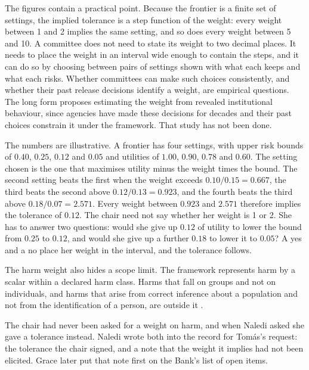 The figures contain a practical point. Because the frontier is a finite set of
settings, the implied tolerance is a step function of the weight: every weight between
1 and 2 implies the same setting, and so does every weight between 5 and 10. A
committee does not need to state its weight to two decimal places. It needs to place
the weight in an interval wide enough to contain the steps, and it can do so by
choosing between pairs of settings shown with what each keeps and what each risks.
Whether committees can make such choices consistently, and whether their past release
decisions identify a weight, are empirical questions. The long form proposes estimating
the weight from revealed institutional behaviour, since agencies have made these
decisions for decades and their past choices constrain it under the framework. That
study has not been done.

\begin{example}\label{c18:ex-weight}
The numbers are illustrative. A frontier has four settings, with upper risk bounds of
$0.40$, $0.25$, $0.12$ and $0.05$ and utilities of $1.00$, $0.90$, $0.78$ and $0.60$. The setting chosen is
the one that maximises utility minus the weight times the bound. The second setting beats
the first when the weight exceeds $0.10/0.15=0.667$, the third beats the second above
$0.12/0.13=0.923$, and the fourth beats the third above $0.18/0.07=2.571$. Every weight between
$0.923$ and $2.571$ therefore implies the tolerance of $0.12$. The chair need not say whether her
weight is 1 or 2. She has to answer two questions: would she give up $0.12$ of utility to
lower the bound from $0.25$ to $0.12$, and would she give up a further $0.18$ to lower it to
$0.05$? A yes and a no place her weight in the interval, and the tolerance follows.
\end{example}

The harm weight also hides a scope limit. The framework represents harm by a scalar
within a declared harm class. Harms that fall on groups and not on individuals, and
harms that arise from correct inference about a population and not from the
identification of a person, are outside it \citep{skinner2012,dwork2014}.

The chair had never been asked for a weight on harm, and when Naledi asked she gave a
tolerance instead. Naledi wrote both into the record for Tom\'as's request: the
tolerance the chair signed, and a note that the weight it implies had not been
elicited. Grace later put that note first on the Bank's list of open items.

